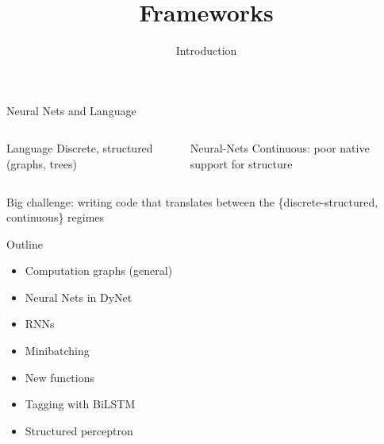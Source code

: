 \documentclass[compress]{beamer}
\title{Frameworks}
\date{Introduction}
\begin{document}



\begin{frame}{Neural Nets and Language}

\begin{columns}
  \begin{block}{Language}
    Discrete, structured (graphs, trees)
  \end{block}
  \begin{block}{Neural-Nets}
    Continuous: poor native support for structure
  \end{block}
\end{columns}

Big challenge: writing code that translates between the \{discrete-structured, continuous\} regimes

\end{frame}


\begin{frame}{Outline}
\begin{itemize}
\item Computation graphs (general)
\item Neural Nets in DyNet
\item RNNs
\item Minibatching
\item New functions
\item Tagging with BiLSTM
\item Structured perceptron
\end{itemize}

\end{frame}
\end{document}
